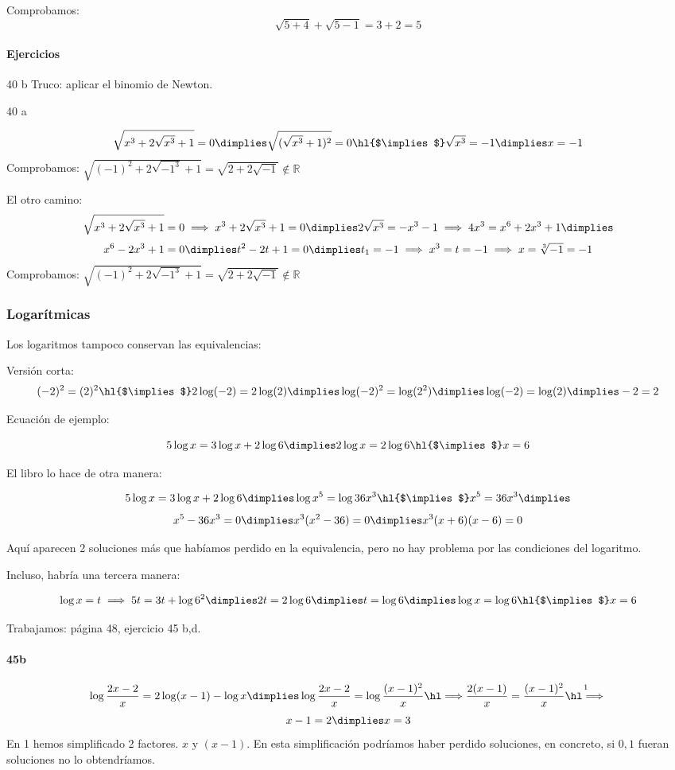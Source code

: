 Comprobamos:
\[
	\sqrt{5+4}+\sqrt{5-1} = 3+2 = 5
\]


\paragraph{Ejercicios} 

40 b Truco: aplicar el binomio de Newton.

40 a

	\[
		\sqrt{x^3+2\sqrt{x^3}+1} = 0 \dimplies \sqrt{(\sqrt{x^3}+1)^2} = 0 \text{\hl{$\implies$}} \sqrt{x^3}=-1 \dimplies x=-1
	\]
	Comprobamos: $\sqrt{(-1)^2+2\sqrt{-1^3}+1} = \sqrt{2+2\sqrt{-1}} \notin ℝ$

	El otro camino:
	\[
		\sqrt{x^3+2\sqrt{x^3}+1} = 0 \implies x^3+2\sqrt{x^3}+1 = 0 \dimplies 2\sqrt{x^3} = -x^3-1 \implies 4x^3=x^6+2x^3+1 \dimplies 
	\]
	\[
		x^6-2x^3+1=0 \dimplies t^2-2t+1=0 \dimplies t_1=-1 \implies x^3=t=-1\implies x=\sqrt[3]{-1}=-1
	\]
	Comprobamos: $\sqrt{(-1)^2+2\sqrt{-1^3}+1} = \sqrt{2+2\sqrt{-1}} \notin ℝ$


\subsubsection{Logarítmicas}

Los logaritmos tampoco conservan las equivalencias:

Versión corta:
\[
	(-2)^2 = (2)^2 \text{\hl{$\implies$}} 2\log(-2) = 2\log(2) \dimplies \log(-2)^2 = \log(2^2) \dimplies \log(-2) = \log(2) \dimplies -2=2
\]

Ecuación de ejemplo:

\[
	5\log x=3\log x+2\log 6 \dimplies 2\log x=2\log6 \text{\hl{$\implies$}} x=6
\]


El libro lo hace de otra manera:

\[
	5\log x=3\log x+2\log 6 \dimplies \log x^5=\log36x^3 \text{\hl{$\implies$}} x^5=36x^3 \dimplies
\]
\[
	x^5-36x^3 = 0 \dimplies x^3(x^2-36) = 0 \dimplies x^3(x+6)(x-6) = 0
\]

Aquí aparecen 2 soluciones más que habíamos perdido en la equivalencia, pero no hay problema por las condiciones del logaritmo.

Incluso, habría una tercera manera:

\[
	\log x=t \implies 5t=3t+\log6^2 \dimplies 2t=2\log6 \dimplies t=\log6 \dimplies \log x=\log6 \text{\hl{$\implies$}} x=6
\]

Trabajamos: página 48, ejercicio 45 b,d.

\paragraph{45b}
\[
	\log\frac{2x-2}{x} = 2\log(x-1)-\log x \dimplies \log \frac{2x-2}{x}=\log\frac{(x-1)^2}{x} \cimplies \frac{2(x-1)}{x} = \frac{(x-1)^2}{x} \overset{1}{\cimplies}
	\]
	\[ 
	x-1=2 \dimplies x=3
\]
En 1 hemos simplificado 2 factores. $x$ y $(x-1)$. En esta simplificación podríamos haber perdido soluciones, en concreto, si $0,1$ fueran soluciones no lo obtendríamos. 

